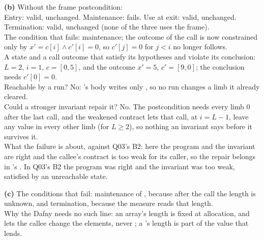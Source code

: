 \documentclass[11pt]{article}
\begin{document}
\begin{answer}
\textbf{(b)} Without the frame postcondition: \\
Entry: valid, unchanged. \quad Maintenance: fails. \quad Use at exit: valid,
unchanged. \quad Termination: valid, unchanged (none of the three uses the
frame). \\
The condition that fails: maintenance; the outcome of the call is now
constrained only by $x' = c[i] \wedge c'[i] = 0$, so $c'[j] = 0$ for $j < i$ no
longer follows. \\
A state and a call outcome that satisfy its hypotheses and violate its
conclusion: $L = 2$, $i = 1$, $c = [0, 5]$, and the outcome $x' = 5$,
$c' = [9, 0]$; the conclusion needs $c'[0] = 0$. \\
Reachable by a run? No: 's body writes only , so no run
changes a limb it already cleared. \\
Could a stronger invariant repair it? No. The postcondition needs every limb
$0$ after the last call, and the weakened contract lets that call, at
$i = L - 1$, leave any value in every other limb (for $L \geq 2$), so nothing
an invariant says before it survives it. \\
What the failure is about, against Q03's B2: here the program and the
invariant are right and the callee's contract is too weak for its caller, so
the repair belongs in 's . In Q03's B2 the program
was right and the invariant was too weak, satisfied by an unreachable state.

\textbf{(c)} The conditions that fail: maintenance of ,
because after the call the length is unknown, and termination, because the
measure  reads that length. \\
Why the Dafny  needs no such line: an array's length is fixed at
allocation, and  lets the callee change the elements, never
; a 's length is part of the value that 
lends.
\end{answer}

\end{document}
